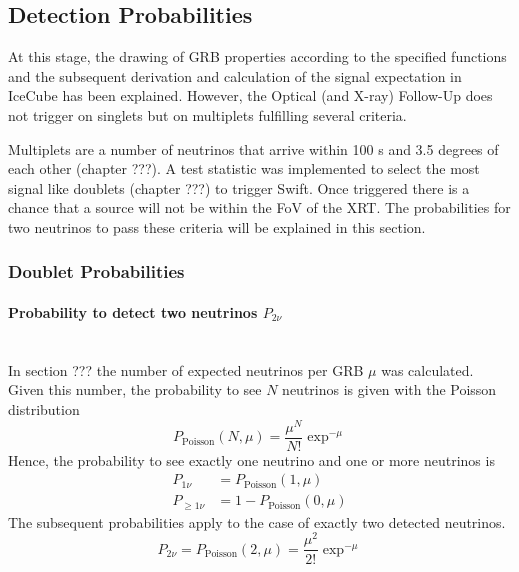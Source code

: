 \subsection{Detection Probabilities}
At this stage, the drawing of GRB properties according to the specified 
functions
and the subsequent derivation and calculation of the signal expectation in
IceCube has been explained. However, the Optical (and X-ray) Follow-Up does not
trigger on singlets but on multiplets fulfilling several criteria.

Multiplets are a number of neutrinos that arrive within 100 s and 3.5 degrees
of each other (chapter ???). A test statistic was implemented to select the
most signal like doublets (chapter ???) to trigger Swift. Once triggered there
is a chance that a source will not be within the FoV of the XRT. The 
probabilities for two neutrinos to pass these criteria will be 
explained in this section.

\subsubsection{Doublet Probabilities}

\paragraph{Probability to detect two neutrinos $P_{2 \nu}$}$\;$\\
In section ??? the number of expected neutrinos per GRB $\mu$ was calculated. 
Given this number, the probability to see $N$ neutrinos is given with the 
Poisson 
distribution
\begin{equation}
  P_\text{Poisson}(N, \mu) = \frac{\mu^N}{N!} \exp^{-\mu}
\end{equation}
Hence, the probability to see exactly one neutrino and one or more neutrinos is 
\begin{eqnarray}
 P_{1 \nu} &= P_\text{Poisson}(1, \mu) \\
 P_{\geq 1 \nu} &= 1 - P_\text{Poisson}(0, \mu)
\end{eqnarray}
The subsequent probabilities apply to the case of exactly two detected 
neutrinos.
\begin{equation}
 P_{2\nu} = P_\text{Poisson}(2, \mu) = \frac{\mu^2}{2!} \exp^{-\mu}
\end{equation}


